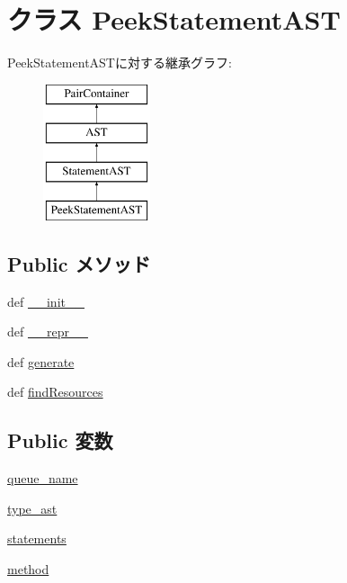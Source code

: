 \hypertarget{classslicc_1_1ast_1_1PeekStatementAST_1_1PeekStatementAST}{
\section{クラス PeekStatementAST}
\label{classslicc_1_1ast_1_1PeekStatementAST_1_1PeekStatementAST}
}
PeekStatementASTに対する継承グラフ:\begin{figure}[H]
\begin{center}
\leavevmode
\includegraphics[height=4cm]{classslicc_1_1ast_1_1PeekStatementAST_1_1PeekStatementAST}
\end{center}
\end{figure}
\subsection*{Public メソッド}
\begin{DoxyCompactItemize}
\item 
def \hyperlink{classslicc_1_1ast_1_1PeekStatementAST_1_1PeekStatementAST_ac775ee34451fdfa742b318538164070e}{\_\-\_\-init\_\-\_\-}
\item 
def \hyperlink{classslicc_1_1ast_1_1PeekStatementAST_1_1PeekStatementAST_ad8b9328939df072e4740cd9a63189744}{\_\-\_\-repr\_\-\_\-}
\item 
def \hyperlink{classslicc_1_1ast_1_1PeekStatementAST_1_1PeekStatementAST_a4555d1cee0dccf3942ea35fe86de2e8e}{generate}
\item 
def \hyperlink{classslicc_1_1ast_1_1PeekStatementAST_1_1PeekStatementAST_abd195c795639b490ba2de4c1246105f1}{findResources}
\end{DoxyCompactItemize}
\subsection*{Public 変数}
\begin{DoxyCompactItemize}
\item 
\hyperlink{classslicc_1_1ast_1_1PeekStatementAST_1_1PeekStatementAST_a733067e60f05a4e8a925c8e36fe46132}{queue\_\-name}
\item 
\hyperlink{classslicc_1_1ast_1_1PeekStatementAST_1_1PeekStatementAST_a2c41e611550596541faa6f64ffecc139}{type\_\-ast}
\item 
\hyperlink{classslicc_1_1ast_1_1PeekStatementAST_1_1PeekStatementAST_aa25d5649a404c698dcacaa271a285c92}{statements}
\item 
\hyperlink{classslicc_1_1ast_1_1PeekStatementAST_1_1PeekStatementAST_abed946c62f140eb7ff2ac742e6ad9497}{method}
\end{DoxyCompactItemize}


